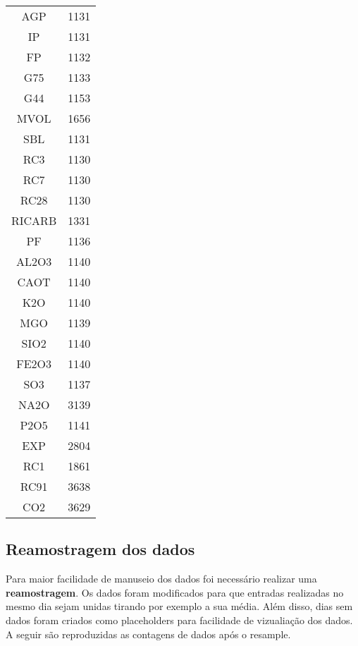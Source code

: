\begin{center}
\begin{tabular}{ c c }
AGP     &  1131\\
IP      &  1131\\
FP      &  1132\\
G75    &  1133\\
G44   &  1153\\
MVOL    &  1656\\
SBL     &  1131\\
RC3     &  1130\\
RC7     &  1130\\
RC28    &  1130\\
RICARB  &  1331\\
PF      &  1136\\
AL2O3   &  1140\\
CAOT    &  1140\\
K2O     &  1140\\
MGO     &  1139\\
SIO2    &  1140\\
FE2O3   &  1140\\
SO3     &  1137\\
NA2O    &  3139\\
P2O5    &  1141\\
EXP     &  2804\\
RC1     &  1861\\
RC91    &  3638\\
CO2     &  3629 
\end{tabular}
\end{center}



\subsection{Reamostragem dos dados}
Para maior facilidade de manuseio dos dados foi necessário realizar uma
\textbf{reamostragem}. Os dados foram modificados para que entradas realizadas no
mesmo dia sejam unidas tirando por exemplo a sua média. Além disso, dias sem dados foram criados como placeholders para facilidade de vizualiação dos dados. A seguir são reproduzidas as contagens de dados após o resample.


